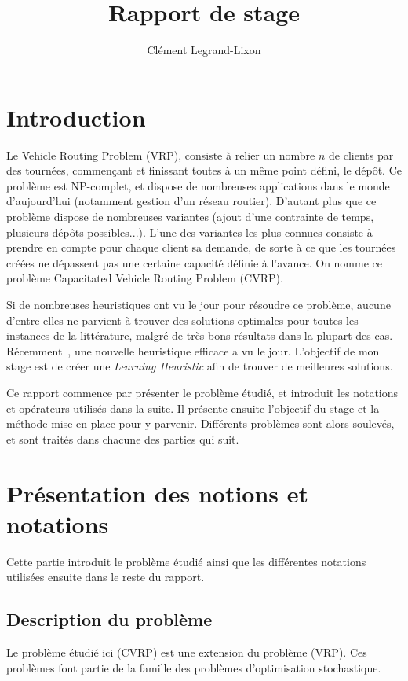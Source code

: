 \documentclass[a4paper,11pt]{article}%
\begin{document}
\title{Rapport de stage}

\author{Clément Legrand-Lixon}

\maketitle


\section*{Introduction}
Le Vehicle Routing Problem (VRP), consiste à relier un nombre $n$ de clients par des tournées, commençant et finissant toutes à un même point défini, le dépôt. 
Ce problème est NP-complet, et dispose de nombreuses applications dans le monde d'aujourd'hui (notamment gestion d'un réseau routier). 
D'autant plus que ce problème dispose de nombreuses variantes (ajout d'une contrainte de temps, plusieurs dépôts possibles...). 
L'une des variantes les plus connues consiste à prendre en compte pour chaque client sa demande, de sorte à ce que les tournées créées ne dépassent pas une certaine capacité définie à l'avance. 
On nomme ce problème Capacitated Vehicle Routing Problem (CVRP). 

Si de nombreuses heuristiques ont vu le jour pour résoudre ce problème, aucune d'entre elles ne parvient à trouver des solutions optimales pour toutes les instances de la littérature, malgré de très bons résultats dans la plupart des cas. Récemment~\cite{Sorensen_2017}, une nouvelle heuristique efficace a vu le jour. L'objectif de mon stage est de créer une \emph{Learning Heuristic} afin de trouver de meilleures solutions.

Ce rapport commence par présenter le problème étudié, et introduit les notations et opérateurs utilisés dans la suite. Il présente ensuite l'objectif du stage et la méthode mise en place pour y parvenir. 
Différents problèmes sont alors soulevés, et sont traités dans chacune des parties qui suit.
  

\section{Présentation des notions et notations}
Cette partie introduit le problème étudié ainsi que les différentes notations utilisées ensuite dans le reste du rapport. 

\subsection{Description du problème}
Le problème étudié ici (CVRP) est une extension du problème (VRP). Ces problèmes font partie de la famille des problèmes d'optimisation stochastique.
\end{document}
